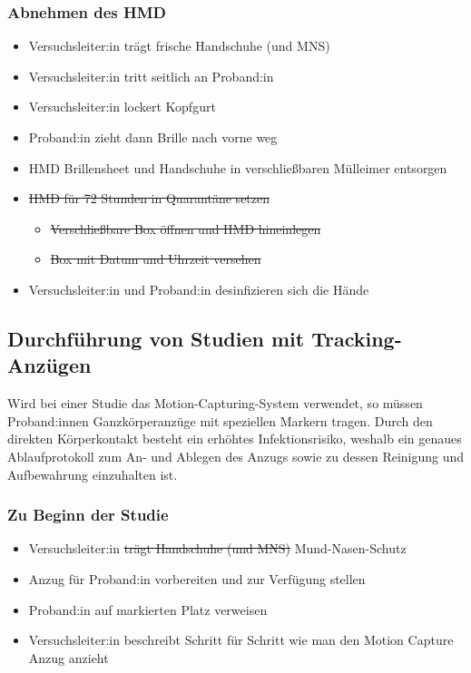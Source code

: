 \subsubsection*{Abnehmen des HMD}

{
\singlespacing
\begin{itemize}
    \item Versuchsleiter:in trägt frische Handschuhe (und MNS)
    \item Versuchsleiter:in tritt seitlich an Proband:in
    \item Versuchsleiter:in lockert Kopfgurt
    \item Proband:in zieht dann Brille nach vorne weg
    \item HMD Brillensheet und Handschuhe in verschließbaren Mülleimer entsorgen
    \item \sout{HMD für 72 Stunden in Quarantäne setzen}
    \begin{itemize}
        \item \sout{Verschließbare Box öffnen und HMD hineinlegen}
        \item \sout{Box mit Datum und Uhrzeit versehen}
    \end{itemize}
    \item Versuchsleiter:in und Proband:in desinfizieren sich die Hände
\end{itemize}
}

\subsection{Durchführung von Studien mit Tracking-Anzügen}\label{subsec:nutzerstudien_mocap}


Wird bei einer Studie das Motion-Capturing-System verwendet, so müssen Proband:innen Ganzkörperanzüge mit speziellen Markern tragen.
Durch den direkten Körperkontakt besteht ein erhöhtes Infektionsrisiko, weshalb ein genaues Ablaufprotokoll zum An- und Ablegen des Anzugs sowie zu dessen Reinigung und Aufbewahrung einzuhalten ist.

\subsubsection*{Zu Beginn der Studie}

{
\singlespacing
\begin{itemize}
    \item Versuchsleiter:in \sout{trägt Handschuhe (und MNS)} Mund-Nasen-Schutz
    \item Anzug für Proband:in vorbereiten und zur Verfügung stellen
    \item Proband:in auf markierten Platz verweisen 
    \item Versuchsleiter:in beschreibt Schritt für Schritt wie man den Motion Capture Anzug anzieht
\end{itemize}
}

